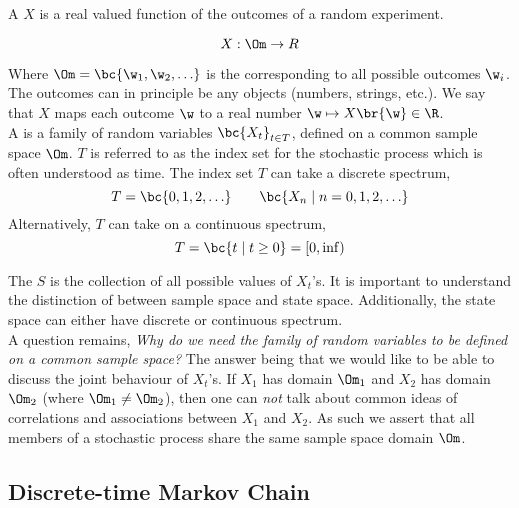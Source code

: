 \documentclass{article}
\begin{document}
A   $X$ is a real valued function of the outcomes of a random experiment.

\[ X : \Om \to R \]

Where $\Om = \bc{\w_1, \w_2, \ldots}$ is the  corresponding to all possible outcomes $\w_i$. The outcomes can in principle be any objects (numbers, strings, etc.). We say that $X$ maps each outcome $\w$ to a real number $\w \mapsto X\br{\w} \in \R$. \\

A  is a family of random variables $\bc{X_t}_{t \in T}$, defined on a common sample space $\Om$. $T$ is referred to as the index set for the stochastic process which is often understood as time. The index set $T$ can take a discrete spectrum,
\[ T = \bc{0, 1, 2, \ldots} \qquad \bc{X_n \mid n = 0, 1, 2, \ldots} \]
Alternatively, $T$ can take on a continuous spectrum,
\[ T = \bc{t \mid t \geq 0} = \left[ 0 , \inf \right) \]

The  $S$ is the collection of all possible values of $X_t$'s. It is important to understand the distinction of between sample space and state space. Additionally, the state space can either have discrete or continuous spectrum. \\

A question remains, \textit{Why do we need the family of random variables to be defined on a common sample space?} The answer being that we would like to be able to discuss the joint behaviour of $X_t$'s. If $X_1$ has domain $\Om_1$ and $X_2$ has domain $\Om_2$ (where $\Om_1 \neq \Om_2$), then one can \textit{not} talk about common ideas of correlations and associations between $X_1$ and $X_2$. As such we assert that all members of a stochastic process share the same sample space domain $\Om$.

\subsection{Discrete-time Markov Chain}
\end{document}
